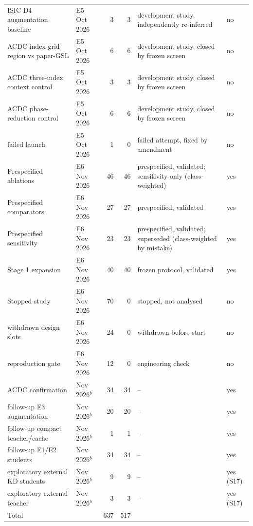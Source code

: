 \begin{longtable}{@{}p{3.6cm}p{1.9cm}rrp{3.4cm}p{1.9cm}@{}}
ISIC D4 augmentation baseline & E5 Oct 2026 & 3 & 3 & development study, independently re-inferred & no \\
ACDC index-grid region vs paper-GSL & E5 Oct 2026 & 6 & 6 & development study, closed by frozen screen & no \\
ACDC three-index context control & E5 Oct 2026 & 3 & 3 & development study, closed by frozen screen & no \\
ACDC phase-reduction control & E5 Oct 2026 & 6 & 6 & development study, closed by frozen screen & no \\
failed launch & E5 Oct 2026 & 1 & 0 & failed attempt, fixed by amendment & no \\
Prespecified ablations & E6 Nov 2026 & 46 & 46 & prespecified, validated; sensitivity only (class-weighted) & yes \\
Prespecified comparators & E6 Nov 2026 & 27 & 27 & prespecified, validated & yes \\
Prespecified sensitivity & E6 Nov 2026 & 23 & 23 & prespecified, validated; superseded (class-weighted by mistake) & yes \\
Stage 1 expansion & E6 Nov 2026 & 40 & 40 & frozen protocol, validated & yes \\
Stopped study & E6 Nov 2026 & 70 & 0 & stopped, not analysed & no \\
withdrawn design slots & E6 Nov 2026 & 24 & 0 & withdrawn before start & no \\
reproduction gate & E6 Nov 2026 & 12 & 0 & engineering check & no \\
ACDC confirmation & Nov 2026$^{b}$ & 34 & 34 & -- & yes \\
follow-up E3 augmentation & Nov 2026$^{b}$ & 20 & 20 & -- & yes \\
follow-up compact teacher/cache & Nov 2026$^{b}$ & 1 & 1 & -- & yes \\
follow-up E1/E2 students & Nov 2026$^{b}$ & 34 & 34 & -- & yes \\
exploratory external KD students & Nov 2026$^{b}$ & 9 & 9 & -- & yes (S17) \\
exploratory external teacher & Nov 2026$^{b}$ & 3 & 3 & -- & yes (S17) \\
\midrule
Total & & 637 & 517 & & \\
\bottomrule
\end{longtable}
